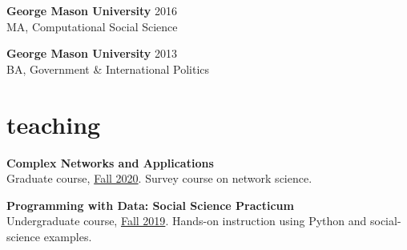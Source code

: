 \documentclass[11pt, letter]{article}
\begin{document}
\textbf{George Mason University}  \hfill 2016 \\
MA, Computational Social Science %
\vspace{2.75mm}

\textbf{George Mason University}  \hfill 2013 \\
BA, Government \& International Politics \\

\vspace{2mm}





\section{teaching}
\textbf{Complex Networks and Applications} \\
Graduate course, \href{https://web.archive.org/web/20210102223738/barabasilab.com/course}{Fall 2020}. Survey course on network science.
\vspace{2.75mm}

\textbf{Programming with Data: Social Science Practicum} \\
Undergraduate course, \href{https://sdmccabe.github.io/ds2001/}{Fall 2019}. Hands-on instruction using Python and social-science examples.
\end{document}
